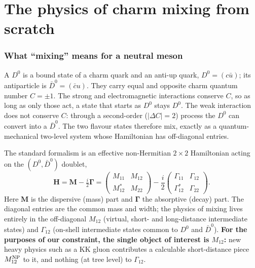 \documentclass[11pt]{article}
\newcommand{\Dz}{D^0}
\newcommand{\Dzbar}{\bar D^0}
\newcommand{\Mtwelve}{M_{12}}
\theoremstyle{definition}
\begin{document}
\part{The physics of charm mixing from scratch}
\label{part:phys}

\section{What ``mixing'' means for a neutral meson}
\label{sec:whatismixing}

A $\Dz$ is a bound state of a charm quark and an anti-up quark,
$\Dz = (c\bar u)$; its antiparticle is $\Dzbar = (\bar c u)$. They carry equal
and opposite charm quantum number $C=\pm1$. The strong and electromagnetic
interactions conserve $C$, so as long as only those act, a state that starts as
$\Dz$ stays $\Dz$. The weak interaction does not conserve $C$: through a
second-order ($|\Delta C|=2$) process the $\Dz$ can convert into a $\Dzbar$.
The two flavour states therefore mix, exactly as a quantum-mechanical
two-level system whose Hamiltonian has off-diagonal entries.

The standard formalism is an effective non-Hermitian $2\times2$ Hamiltonian
acting on the $(\Dz,\Dzbar)$ doublet,
\begin{equation}
\mathbf{H} = \mathbf{M} - \tfrac{i}{2}\boldsymbol{\Gamma}
= \begin{pmatrix} M_{11} & \Mtwelve \\ \Mtwelve^{*} & M_{22}\end{pmatrix}
- \frac{i}{2}\begin{pmatrix} \Gamma_{11} & \Gamma_{12} \\ \Gamma_{12}^{*} & \Gamma_{22}\end{pmatrix}.
\label{eq:Heff}
\end{equation}
Here $\mathbf{M}$ is the dispersive (mass) part and $\boldsymbol{\Gamma}$ the
absorptive (decay) part. The diagonal entries are the common mass and width;
the physics of mixing lives entirely in the off-diagonal $\Mtwelve$ (virtual,
short- and long-distance intermediate states) and $\Gamma_{12}$ (on-shell
intermediate states common to $\Dz$ and $\Dzbar$). \textbf{For the purposes of
our constraint, the single object of interest is $\Mtwelve$:} new heavy physics
such as a KK gluon contributes a calculable short-distance piece
$\Mtwelve^{\rm NP}$ to it, and nothing (at tree level) to $\Gamma_{12}$.
\end{document}
